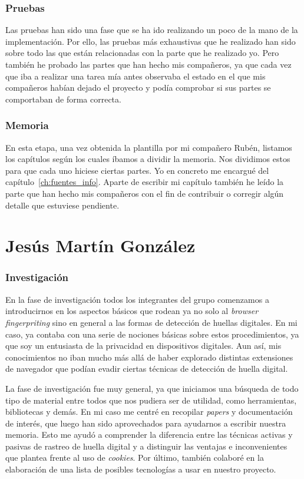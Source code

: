 \subsubsection{Pruebas}
Las pruebas han sido una fase que se ha ido realizando un poco de la mano de la implementación. Por ello, las pruebas más exhaustivas que he realizado han sido sobre todo las que están relacionadas con la parte que he realizado yo. Pero también he probado las partes que han hecho mis compañeros, ya que cada vez que iba a realizar una tarea mía antes observaba el estado en el que mis compañeros habían dejado el proyecto y podía comprobar si sus partes se comportaban de forma correcta.
\subsubsection{Memoria}
En esta etapa, una vez obtenida la plantilla por mi compañero Rubén, listamos los capítulos según los cuales íbamos a dividir la memoria. Nos dividimos estos para que cada uno hiciese ciertas partes. Yo en concreto me encargué del capítulo~\ref{ch:fuentes_info}. Aparte de escribir mi capítulo también he leído la parte que han hecho mis compañeros con el fin de contribuir o corregir algún detalle que estuviese pendiente.


\section{Jesús Martín González}
\subsubsection{Investigación}
En la fase de investigación todos los integrantes del grupo comenzamos a introducirnos en los aspectos básicos que rodean ya no solo al \textit{browser fingerpriting} sino en general a las formas de detección de huellas digitales. En mi caso, ya contaba con una serie de nociones básicas sobre estos procedimientos, ya que soy un entusiasta de la privacidad en dispositivos digitales. Aun así, mis conocimientos no iban mucho más allá de haber explorado distintas extensiones de navegador que podían evadir ciertas técnicas de detección de huella digital. \par

La fase de investigación fue muy general, ya que iniciamos una búsqueda de todo tipo de material entre todos que nos pudiera ser de utilidad, como herramientas, bibliotecas y demás. En mi caso me centré en recopilar \textit{papers} y documentación de interés, que luego han sido aprovechados para ayudarnos a escribir nuestra memoria. Esto me ayudó a comprender la diferencia entre las técnicas activas y pasivas de rastreo de huella digital y a distinguir las ventajas e inconvenientes que plantea frente al uso de \emph{cookies}. Por último, también colaboré en la elaboración de una lista de posibles tecnologías a usar en nuestro proyecto. \par

